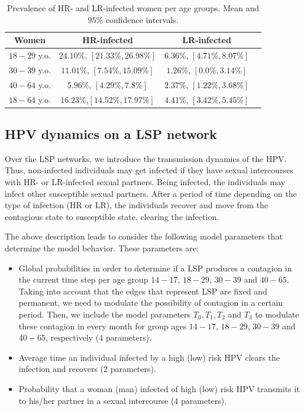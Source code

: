 \begin{table}[h]
	\small\sf\centering
	\caption{Prevalence of HR- and LR-infected women per age groups. Mean and $95\%$ confidence intervals.}
	\begin{tabular}{c|ccc}
		\toprule
		Women & HR-infected & LR-infected \\
		\midrule
		$18-29$ y.o. & $24.10\%$, $[21.33\%, 26.98\%]$ & $6.36\%$, $[4.71\%, 8.07\%]$ \\
		$30-39$ y.o. & $11.01\%$, $[7.54\%, 15.09\%]$ & $1.26\%$, $[0.0\%, 3.14\%]$ \\
		$40-64$ y.o. & $5.96\%$, $[4.29\%, 7.8\%]$ & $2.37\%$, $[1.22\%, 3.68\%]$ \\
		\midrule
		$18-64$ y.o. & $16.23\%$,$[14.52\%, 17.97\%]$ & $4.41\%$, $[3.42\%, 5.45\%]$ \\
		\bottomrule
	\end{tabular}
	\label{datos}
\end{table}

\subsection{HPV dynamics on a LSP network}
Over the LSP networks, we introduce the transmission dynamics of the HPV. Thus, non-infected individuals may get infected if they have sexual intercourses with HR- or LR-infected sexual partners. Being infected, the individuals may infect other susceptible sexual partners. After a period of time depending on the type of infection (HR or LR), the individuals recover and move from the contagious state to susceptible state, clearing the infection.

The above description leads to consider the following model parameters that determine the model behavior. These parameters are:

\begin{itemize}
	\item Global probabilities in order to determine if a LSP produces a contagion in the current time step per age group $14-17$, $18-29$, $30-39$ and $40-65$. Taking into account that the edges that represent LSP are fixed and permanent, we need to modulate the possibility of contagion in a certain period. Then, we include the model parameters $T_0, T_1, T_2$ and $T_3$ to modulate these contagion in every month for group ages $14-17$, $18-29$, $30-39$ and $40-65$, respectively (4 parameters).
	\item Average time an individual infected by a high (low) risk HPV clears the infection and recovers (2 parameters).
	\item Probability that a woman (man) infected of high (low) risk HPV transmits it to his/her
	partner in a sexual intercourse (4 parameters). 
\end{itemize}

